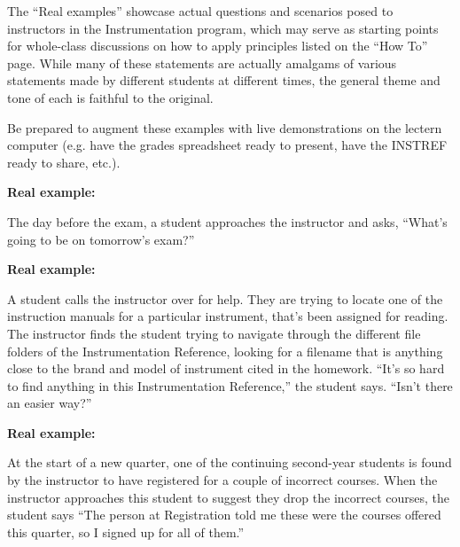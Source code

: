 \vskip 10pt

The ``Real examples'' showcase actual questions and scenarios posed to instructors in the Instrumentation program, which may serve as starting points for whole-class discussions on how to apply principles listed on the ``How To'' page.  While many of these statements are actually amalgams of various statements made by different students at different times, the general theme and tone of each is faithful to the original.

\vskip 10pt

Be prepared to augment these examples with live demonstrations on the lectern computer (e.g. have the grades spreadsheet ready to present, have the INSTREF ready to share, etc.).









\vfil \eject
\noindent
{\bf Real example:} 

The day before the exam, a student approaches the instructor and asks, ``What's going to be on tomorrow's exam?''







\vfil \eject
\noindent
{\bf Real example:} 

A student calls the instructor over for help.  They are trying to locate one of the instruction manuals for a particular instrument, that's been assigned for reading.  The instructor finds the student trying to navigate through the different file folders of the Instrumentation Reference, looking for a filename that is anything close to the brand and model of instrument cited in the homework.  ``It's so hard to find anything in this Instrumentation Reference,'' the student says.  ``Isn't there an easier way?''







\vfil \eject
\noindent
{\bf Real example:} 

At the start of a new quarter, one of the continuing second-year students is found by the instructor to have registered for a couple of incorrect courses.  When the instructor approaches this student to suggest they drop the incorrect courses, the student says ``The person at Registration told me these were the courses offered this quarter, so I signed up for all of them.''







